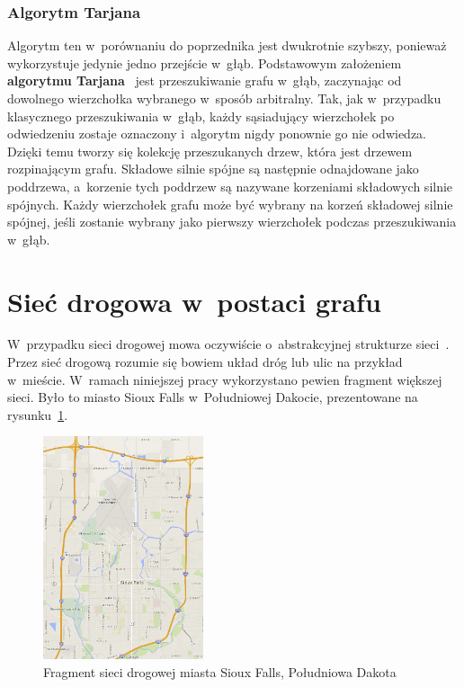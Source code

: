\documentclass[twoside,12pt]{report}
\begin{document}
\subsubsection{Algorytm Tarjana}
Algorytm ten w~porównaniu do poprzednika jest dwukrotnie szybszy, ponieważ wykorzystuje jedynie jedno przejście w~głąb. Podstawowym założeniem \textbf{algorytmu  Tarjana}~\cite{tarjan} jest przeszukiwanie grafu w~głąb, zaczynając od dowolnego wierzchołka wybranego w~sposób arbitralny. Tak, jak w~przypadku klasycznego przeszukiwania w~głąb, każdy sąsiadujący wierzchołek po odwiedzeniu zostaje oznaczony i~algorytm nigdy ponownie go nie odwiedza. Dzięki temu tworzy się kolekcję przeszukanych drzew, która jest drzewem rozpinającym grafu. Składowe silnie spójne są następnie odnajdowane jako poddrzewa, a~korzenie tych poddrzew są nazywane korzeniami składowych silnie spójnych. Każdy wierzchołek grafu może być wybrany na korzeń składowej silnie spójnej, jeśli zostanie wybrany jako pierwszy wierzchołek podczas przeszukiwania w~głąb.

\section{Sieć drogowa w~postaci grafu}
W~przypadku sieci drogowej mowa oczywiście o~abstrakcyjnej strukturze sieci~\cite{reducingtheeffects}. Przez sieć drogową rozumie się bowiem układ dróg lub ulic na przykład w~mieście. W~ramach niniejszej pracy wykorzystano pewien fragment większej sieci. Było to miasto Sioux Falls w~Południowej Dakocie, prezentowane na rysunku~\ref{fig:fragment_sieci_siouxfalls}.

\begin{figure}[htbp]
	\centering
	\includegraphics[width=0.42\textwidth]{img/siec}
	\caption{Fragment sieci drogowej miasta Sioux Falls, Południowa Dakota} 
	\label{fig:fragment_sieci_siouxfalls}
\end{figure}
\end{document}
